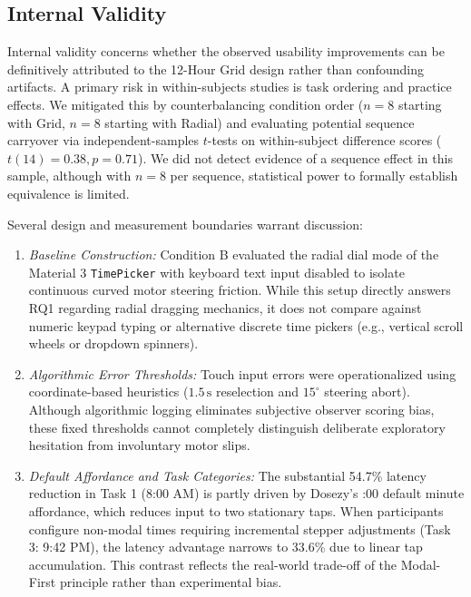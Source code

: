 \documentclass[11pt,a4paper]{article}
\begin{document}
\subsection{Internal Validity}
Internal validity concerns whether the observed usability improvements can be definitively attributed to the 12-Hour Grid design rather than confounding artifacts. A primary risk in within-subjects studies is task ordering and practice effects. We mitigated this by counterbalancing condition order ($n=8$ starting with Grid, $n=8$ starting with Radial) and evaluating potential sequence carryover via independent-samples $t$-tests on within-subject difference scores ($t(14) = 0.38, p = 0.71$). We did not detect evidence of a sequence effect in this sample, although with $n=8$ per sequence, statistical power to formally establish equivalence is limited.

Several design and measurement boundaries warrant discussion:
\begin{enumerate}[leftmargin=*]
    \item \emph{Baseline Construction:} Condition B evaluated the radial dial mode of the Material 3 \texttt{TimePicker} with keyboard text input disabled to isolate continuous curved motor steering friction. While this setup directly answers RQ1 regarding radial dragging mechanics, it does not compare against numeric keypad typing or alternative discrete time pickers (e.g., vertical scroll wheels or dropdown spinners).
    \item \emph{Algorithmic Error Thresholds:} Touch input errors were operationalized using coordinate-based heuristics ($1.5\,\text{s}$ reselection and $15^\circ$ steering abort). Although algorithmic logging eliminates subjective observer scoring bias, these fixed thresholds cannot completely distinguish deliberate exploratory hesitation from involuntary motor slips.
    \item \emph{Default Affordance and Task Categories:} The substantial 54.7\% latency reduction in Task 1 (8:00 AM) is partly driven by Dosezy's :00 default minute affordance, which reduces input to two stationary taps. When participants configure non-modal times requiring incremental stepper adjustments (Task 3: 9:42 PM), the latency advantage narrows to 33.6\% due to linear tap accumulation. This contrast reflects the real-world trade-off of the Modal-First principle rather than experimental bias.
\end{enumerate}
\end{document}
